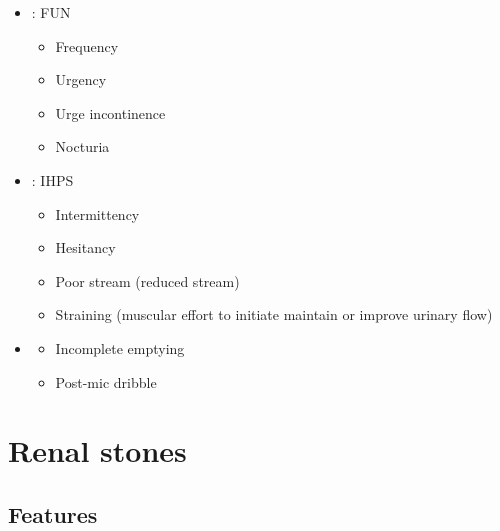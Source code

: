 \documentclass[
  12pt,
]{memoir}
\providecommand{\tightlist}{%
  \setlength{\itemsep}{0pt}\setlength{\parskip}{0pt}}
\begin{document}
\begin{itemize}
\tightlist
\item
  \textbf{}: FUN

  \begin{itemize}
  \tightlist
  \item
    Frequency
  \item
    Urgency
  \item
    Urge incontinence
  \item
    Nocturia
  \end{itemize}
\item
  \textbf{}: IHPS

  \begin{itemize}
  \tightlist
  \item
    Intermittency
  \item
    Hesitancy
  \item
    Poor stream (reduced stream)
  \item
    Straining (muscular effort to initiate maintain or improve urinary
    flow)
  \end{itemize}
\item
  \textbf{}

  \begin{itemize}
  \tightlist
  \item
    Incomplete emptying
  \item
    Post-mic dribble
  \end{itemize}
\end{itemize}

\hypertarget{renal-stones}{%
\section{Renal stones}\label{renal-stones}}

\hypertarget{features-4}{%
\subsection{Features}\label{features-4}}
\end{document}
